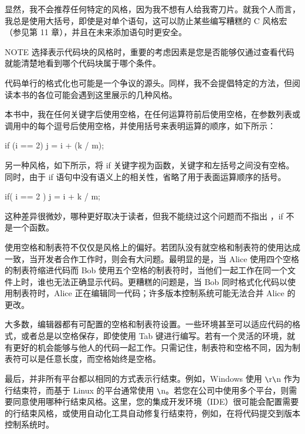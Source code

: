 显然，我不会推荐任何特定的风格，因为我不想有人给我寄刀片。就我个人而言，我总是使用大括号，即使是对单个语句，这可以防止某些编写糟糕的 C 风格宏（参见第 11 章），并且在未来添加语句时更安全。

\begin{myNotic}{NOTE}
选择表示代码块的风格时，重要的考虑因素是您是否能够仅通过查看代码就能清楚地看到哪个代码块属于哪个条件。
\end{myNotic}


代码单行的格式化也可能是一个争议的源头。同样，我不会提倡特定的方法，但阅读本书的各位可能会遇到这里展示的几种风格。

本书中，我在任何关键字后使用空格，在任何运算符前后使用空格，在参数列表或调用中的每个逗号后使用空格，并使用括号来表明运算的顺序，如下所示：

\begin{cpp}
if (i == 2) {
    j = i + (k / m);
}
\end{cpp}

另一种风格，如下所示，将 if 关键字视为函数，关键字和左括号之间没有空格。同时，由于 if 语句中没有语义上的相关性，省略了用于表面运算顺序的括号。

\begin{cpp}
if( i == 2 ) {
    j = i + k / m;
}
\end{cpp}

这种差异很微妙，哪种更好取决于读者，但我不能绕过这个问题而不指出 ，if 不是一个函数。


使用空格和制表符不仅仅是风格上的偏好。若团队没有就空格和制表符的使用达成一致，当开发者合作工作时，则会有大问题。最明显的是，当 Alice 使用四个空格的制表符缩进代码而 Bob 使用五个空格的制表符时，当他们一起工作在同一个文件上时，谁也无法正确显示代码。更糟糕的问题是，当 Bob 同时格式化代码以使用制表符时，Alice 正在编辑同一代码；许多版本控制系统可能无法合并 Alice 的更改。

大多数，编辑器都有可配置的空格和制表符设置。一些环境甚至可以适应代码的格式，或者总是以空格保存，即使使用 Tab 键进行编写。若有一个灵活的环境，就有更好的机会能够与他人的代码一起工作。只需记住，制表符和空格不同，因为制表符可以是任意长度，而空格始终是空格。

最后，并非所有平台都以相同的方式表示行结束。例如，Windows 使用 \verb|\|r\verb|\|n 作为行结束符，而基于 Linux 的平台通常使用 \verb|\|n。若您在公司中使用多个平台，则需要同意使用哪种行结束风格。这里，您的集成开发环境（IDE）很可能会配置需要的行结束风格，或使用自动化工具自动修复行结束符，例如，在将代码提交到版本控制系统时。

